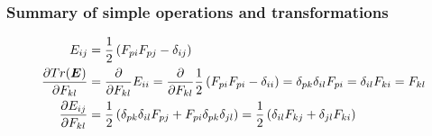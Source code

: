 \documentclass[oneside,11pt,times]{book}
\begin{document}
\subsubsection*{Summary of simple operations and transformations}
\begin{equation*}
\begin{aligned}
\centering
E_{ij}&=\frac{1}{2}\left(F_{pi}F_{pj}-\delta_{ij}\right)\\\frac{\partial Tr(\boldsymbol{E})}{\partial F_{kl}}&=\frac{\partial}{\partial F_{kl}} E_{ii}=\frac{\partial}{\partial F_{kl}} \frac{1}{2}\left(F_{pi}F_{pi}-\delta_{ii}\right)=\delta_{pk}\delta_{il}F_{pi}=\delta_{il}F_{ki}=F_{kl}
\\\frac{\partial E_{ij}}{\partial F_{kl}}&=\frac{1}{2}\left(\delta_{pk}\delta_{il}F_{pj}+F_{pi}\delta_{pk}\delta_{jl}\right)=\frac{1}{2}\left(\delta_{il}F_{kj}+\delta_{jl}F_{ki}\right)
\end{aligned}
\end{equation*}
\end{document}
